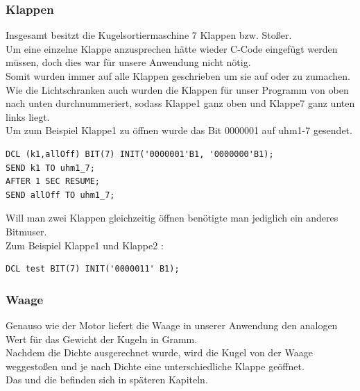\subsubsection{Klappen}
Insgesamt besitzt die Kugelsortiermaschine 7 Klappen bzw. Stoßer.\\
Um eine einzelne Klappe anzusprechen hätte wieder C-Code eingefügt werden müssen, doch dies war für unsere Anwendung nicht nötig.\\
Somit wurden immer auf alle Klappen geschrieben um sie auf oder zu zumachen.\\ 
Wie die Lichtschranken auch wurden die Klappen für unser Programm von oben nach unten durchnummeriert, sodass Klappe1 ganz oben und Klappe7 ganz unten links liegt.\\
Um zum Beispiel Klappe1 zu öffnen wurde das Bit 0000001 auf uhm1-7 gesendet.\\
\begin{lstlisting}
DCL (k1,allOff) BIT(7) INIT('0000001'B1, '0000000'B1);
SEND k1 TO uhm1_7;
AFTER 1 SEC RESUME;
SEND allOff TO uhm1_7;
\end{lstlisting}
Will man zwei Klappen gleichzeitig öffnen benötigte man jediglich ein anderes Bitmuser.\\
Zum Beispiel Klappe1 und Klappe2 :
\begin{lstlisting}
DCL test BIT(7) INIT('0000011' B1);
\end{lstlisting}
\subsubsection{Waage}
Genauso wie der Motor liefert die Waage in unserer Anwendung den analogen Wert für das Gewicht der Kugeln in Gramm.\\
Nachdem die Dichte ausgerechnet wurde, wird die Kugel von der Waage weggestoßen und je nach Dichte eine unterschiedliche Klappe geöffnet.\\
Das  und die  befinden sich in späteren Kapiteln.\\
\clearpage

